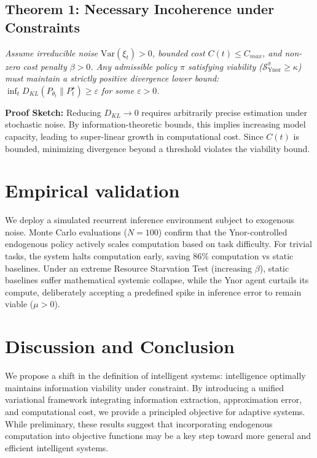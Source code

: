 \documentclass{article}
\begin{document}
\subsection{Theorem 1: Necessary Incoherence under Constraints}
\textit{Assume irreducible noise $\mathrm{Var}(\xi_t) > 0$, bounded cost $C(t) \le C_{max}$, and non-zero cost penalty $\beta > 0$. Any admissible policy $\pi$ satisfying viability ($\mathcal{S}_{\text{Ynor}}^\pi \ge \kappa$) must maintain a strictly positive divergence lower bound: $\inf_t D_{KL}(P_{\theta_t} \parallel P_t^\star) \ge \varepsilon$ for some $\varepsilon > 0$.}

\textbf{Proof Sketch:} Reducing $D_{KL} \to 0$ requires arbitrarily precise estimation under stochastic noise. By information-theoretic bounds, this implies increasing model capacity, leading to super-linear growth in computational cost. Since $C(t)$ is bounded, minimizing divergence beyond a threshold violates the viability bound.

\section{Empirical validation}
We deploy a simulated recurrent inference environment subject to exogenous noise. Monte Carlo evaluations ($N=100$) confirm that the Ynor-controlled endogenous policy actively scales computation based on task difficulty. 
For trivial tasks, the system halts computation early, saving $86\%$ computation vs static baselines. Under an extreme Resource Starvation Test (increasing $\beta$), static baselines suffer mathematical systemic collapse, while the Ynor agent curtails its compute, deliberately accepting a predefined spike in inference error to remain viable ($\mu > 0$).

\section{Discussion and Conclusion}
We propose a shift in the definition of intelligent systems: intelligence optimally maintains information viability under constraint. By introducing a unified variational framework integrating information extraction, approximation error, and computational cost, we provide a principled objective for adaptive systems.
While preliminary, these results suggest that incorporating endogenous computation into objective functions may be a key step toward more general and efficient intelligent systems.
\end{document}

